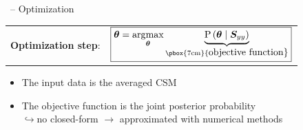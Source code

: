 \documentclass[10pt,xcolor=x11names,compress, show notes]{beamer}%
\begin{document}
\begin{frame}{\insertsectionhead ~-- Optimization}
	\centering
	\vfill	
	\begin{tabular}{c c}
		\textbf{Optimization step}:&
		$\boxed{ \displaystyle  \bm{\theta} =\underset{\bm{\theta}}{\arg\!\max} \underbrace{\text{P} \left( \bm{\theta} \mid \bm{S}_{yy}\right)}_{ \text{\pbox{7cm}{\centering \normalsize objective function}}}}$ %
	\end{tabular}
	\vfill
	\flushleft
	\begin{itemize}
        		\item The input data is the averaged CSM
        		\item The objective function is the joint posterior probability\\  $\hookrightarrow$no closed-form	$\rightarrow$ approximated with numerical methods
\end{itemize}
	
	


\end{frame}
\end{document}
